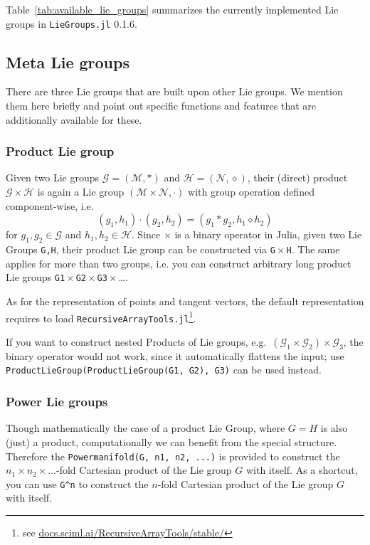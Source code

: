 \documentclass{juliacon}
\newcommand{\LieGroupsVersion}{0.1.6}
\begin{document}
Table~\ref{tab:available_lie_groups} summarizes the currently implemented Lie groups in \verb|LieGroups.jl| \LieGroupsVersion.

\subsection{Meta Lie groups}\label{subsec:MetaLieGroups}

There are three Lie groups that are built upon other Lie groups. We mention them here briefly and point out specific functions and features that are additionally available for these.

\subsubsection*{Product Lie group}

Given two Lie groups \(\mathcal{G} = (\mathcal M, \ast) \) and \(\mathcal{H} = (\mathcal N, \diamond)\), their (direct) product \(\mathcal{G} \times \mathcal{H}\) is again a Lie group \((\mathcal{M} \times \mathcal{N}, \cdot)\) with group operation defined component-wise, i.e.
\begin{equation*}
    (g_1, h_1) \cdot (g_2, h_2) = (g_1 \ast g_2, h_1 \diamond h_2)
\end{equation*}
for \(g_1, g_2 \in \mathcal{G}\) and \(h_1, h_2 \in \mathcal{H}\).
Since $\times$ is a binary operator in Julia, given two Lie Groups \verb|G,H|, their product Lie group can be constructed via \verb|G|\,$\times$\,\verb|H|.
The same applies for more than two groups, i.e. you can construct arbitrary long product Lie groups \verb|G1|\,$\times$\,\verb|G2|\,$\times$\,\verb|G3|\,$\times$\,\ldots.

As for the representation of points and tangent vectors, the default representation requires to load \verb|RecursiveArrayTools.jl|\footnote{see \href{https://docs.sciml.ai/RecursiveArrayTools/stable/}{docs.sciml.ai/RecursiveArrayTools/stable/}}.

If you want to construct nested Products of Lie groups, e.g.\ \((\mathcal G_1 \times \mathcal G_2) \times \mathcal G_3\), the binary operator would not work, since it automatically flattens the input; use \verb|ProductLieGroup(ProductLieGroup(G1, G2), G3)| can be used instead.

\subsubsection*{Power Lie groups}
Though mathematically the case of a product Lie Group, where $G=H$ is also (just) a product, computationally we can benefit from the special structure. Therefore the \verb|Powermanifold(G, n1, n2, ...)| is provided to construct the \(n_1 \times n_2 \times \ldots\)-fold Cartesian product of the Lie group \(G\) with itself.
As a shortcut, you can use \verb|G^n| to construct the \(n\)-fold Cartesian product of the Lie group \(G\) with itself.
\end{document}
